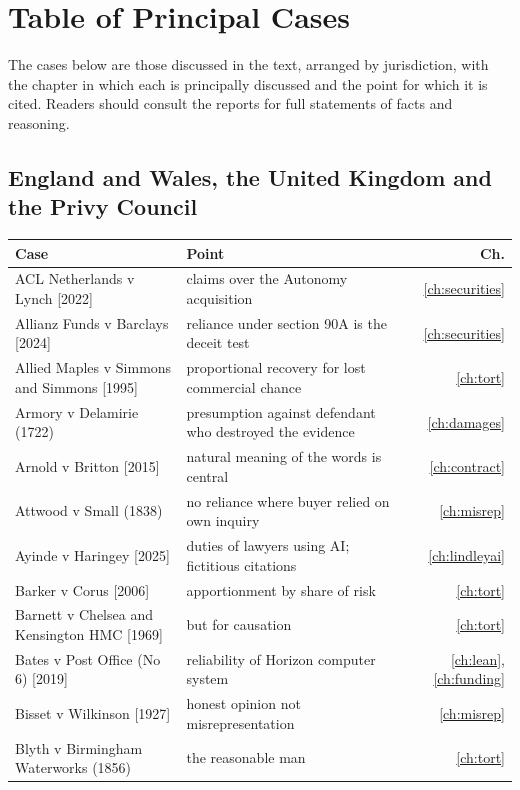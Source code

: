 \chapter{Table of Principal Cases}
\label{app:cases}

The cases below are those discussed in the text, arranged by jurisdiction, with the chapter in which each is principally discussed and the point for which it is cited. Readers should consult the reports for full statements of facts and reasoning.

\small
\renewcommand{\arraystretch}{1.15}

\section*{England and Wales, the United Kingdom and the Privy Council}
\begin{longtable}{>{\raggedright\arraybackslash}p{3.7cm} >{\raggedright\arraybackslash}p{5.6cm} r}
\toprule
Case & Point & Ch.\\
\midrule
ACL Netherlands v Lynch [2022] & claims over the Autonomy acquisition & \ref{ch:securities}\\
Allianz Funds v Barclays [2024] & reliance under section 90A is the deceit test & \ref{ch:securities}\\
Allied Maples v Simmons and Simmons [1995] & proportional recovery for lost commercial chance & \ref{ch:tort}\\
Armory v Delamirie (1722) & presumption against defendant who destroyed the evidence & \ref{ch:damages}\\
Arnold v Britton [2015] & natural meaning of the words is central & \ref{ch:contract}\\
Attwood v Small (1838) & no reliance where buyer relied on own inquiry & \ref{ch:misrep}\\
Ayinde v Haringey [2025] & duties of lawyers using AI; fictitious citations & \ref{ch:lindleyai}\\
Barker v Corus [2006] & apportionment by share of risk & \ref{ch:tort}\\
Barnett v Chelsea and Kensington HMC [1969] & but for causation & \ref{ch:tort}\\
Bates v Post Office (No 6) [2019] & reliability of Horizon computer system & \ref{ch:lean}, \ref{ch:funding}\\
Bisset v Wilkinson [1927] & honest opinion not misrepresentation & \ref{ch:misrep}\\
Blyth v Birmingham Waterworks (1856) & the reasonable man & \ref{ch:tort}\\

\end{longtable}
